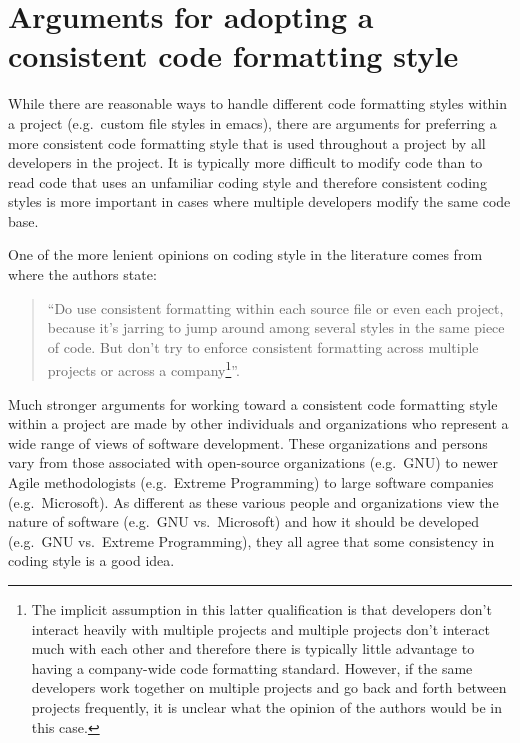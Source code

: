 %
\section{Arguments for adopting a consistent code formatting style}
\label{sec:arguments-for-consistent-style}
%

While there are reasonable ways to handle different code formatting styles
within a project (e.g.\ custom file styles in emacs), there are arguments for
preferring a more consistent code formatting style that is used throughout a
project by all developers in the project.  It is typically more difficult to
modify code than to read code that uses an unfamiliar coding style and
therefore consistent coding styles is more important in cases where multiple
developers modify the same code base.

One of the more lenient opinions on coding style in the literature comes from
{}\cite[Item 0]{C++CodingStandards05} where the authors state:

\begin{quote}

``Do use consistent formatting within each source file or even each project,
because it's jarring to jump around among several styles in the same piece of
code.  But don't try to enforce consistent formatting across multiple projects
or across a company\footnote{The implicit assumption in this latter
qualification is that developers don't interact heavily with multiple projects
and multiple projects don't interact much with each other and therefore there
is typically little advantage to having a company-wide code formatting
standard.  However, if the same developers work together on multiple projects
and go back and forth between projects frequently, it is unclear what the
opinion of the authors would be in this case.}''.

\end{quote}

Much stronger arguments for working toward a consistent code formatting style
within a project are made by other individuals and organizations who represent
a wide range of views of software development.  These organizations and
persons vary from those associated with open-source organizations (e.g.\ GNU)
to newer Agile methodologists (e.g.\ Extreme Programming) to large software
companies (e.g.\ Microsoft).  As different as these various people and
organizations view the nature of software (e.g.\ GNU vs.\ Microsoft) and how
it should be developed (e.g.\ GNU vs.\ Extreme Programming), they all agree
that some consistency in coding style is a good idea.

